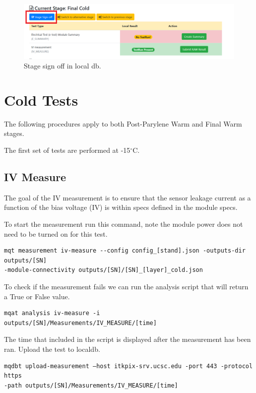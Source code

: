 \documentclass[12pt]{article}
\begin{document}
\begin{figure}[H]
    \centering
    \includegraphics[width=1\linewidth]{Figures/localdbsignoff.png}
    \caption{Stage sign off in local db.}
    \label{fig:sign-off}
\end{figure}

\newpage
\section{Cold Tests}

The following procedures apply to both Post-Parylene Warm and Final Warm stages.

The first set of tests are performed at -15$^\circ$C.

\subsection{IV Measure}
The goal of the IV measurement is to ensure that the sensor leakage current as a function of the bias voltage (IV) is within specs defined in the module specs. 

To start the measurement run this command, note the module power does not need to be turned on for this test.

\begin{verbatim}
mqt measurement iv-measure --config config_[stand].json -outputs-dir outputs/[SN]
-module-connectivity outputs/[SN]/[SN]_[layer]_cold.json
\end{verbatim}

To check if the measurement fails we can run the analysis script that will return a True or False value. 
\begin{verbatim}
mqat analysis iv-measure -i outputs/[SN]/Measurements/IV_MEASURE/[time]
\end{verbatim}

The time that included in the script is displayed after the measurement has been ran. Upload the test to localdb.

\begin{verbatim}
mqdbt upload-measurement –host itkpix-srv.ucsc.edu -port 443 -protocol https
-path outputs/[SN]/Measurements/IV_MEASURE/[time]
\end{verbatim}
\end{document}
